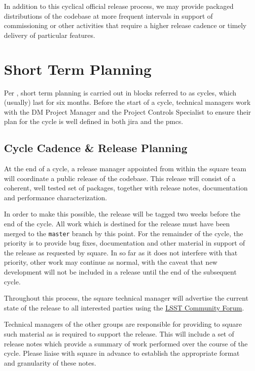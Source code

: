 In addition to this cyclical official release process, we may provide
packaged distributions of the codebase at more frequent intervals in
support of commissioning or other activities that require a higher
release cadence or timely delivery of particular features.

\section{Short Term Planning}
\label{sec:cycle-plan}

Per , short term planning is carried out in blocks referred to as \glspl{cycle}, which (usually) last for six months.
Before the start of a \gls{cycle}, technical managers work with the DM Project Manager and the Project Controls Specialist to ensure their plan for the \gls{cycle} is well defined in both \gls{jira} and the \gls{pmcs}.

\subsection{Cycle Cadence \& Release Planning}
\label{sec:cycle-cadence}

At the end of a \gls{cycle}, a release manager appointed from within the \gls{square} team will coordinate a public release of the codebase.
This release will consist of a coherent, well tested set of packages, together with release notes, documentation and performance characterization.

In order to make this possible, the release will be tagged two weeks before the end of the \gls{cycle}.
All work which is destined for the release must have been merged to the \texttt{master} branch by this point.
For the remainder of the \gls{cycle}, the priority is to provide bug fixes, documentation and other material in support of the release as requested by \gls{square}.
In so far as it does not interfere with that priority, other work may continue as normal, with the caveat that new development will not be included in a release until the end of the subsequent \gls{cycle}.

Throughout this process, the \gls{square} technical manager will advertise the
current state of the release to all interested parties using the
\href{https://community.lsst.org/}{LSST Community Forum}.

Technical managers of the other groups are responsible for providing to \gls{square} such material as is required to support the release.
This will include a set of release notes which provide a summary of work performed over the course of the \gls{cycle}.
Please liaise with \gls{square} in advance to establish the appropriate format and granularity of these notes.

